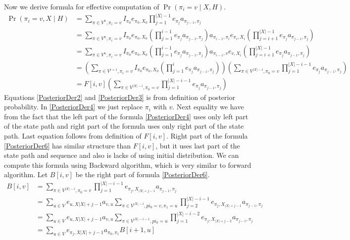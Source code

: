 Now we derive formula for effective computation of  $\Pr\left(\pi_i=v\mid
X,H\right)$.
\begin{align}
\Pr\left(\pi_i=v,X\mid H\right) &=  
				\sum_{\pi\in
				V^n,\pi_i=v}I_{\pi_0}e_{\pi_0,X_0}\prod_{j=1}^{|X|-1}e_{\pi_j}a_{\pi_{j-1},\pi_j}
					\label{PosteriorDer2}\\
				&= \sum_{\pi\in V^n,\pi_i=v}I_{\pi_0}e_{\pi_0,X_0}
				\left( 
					\prod_{j=1}^{i-1} e_{\pi_j}a_{\pi_{j-1},\pi_j}
				\right)
				a_{\pi_{i-1},\pi_i}e_{\pi_i,X_i}
				\left(  
					\prod_{j=i+1}^{|X|-1} e_{\pi_j}a_{\pi_{j-1},\pi_j}
				\right)
					\label{PosteriorDer3}\\
				&= \sum_{\pi\in V^n,\pi_i=v}I_{\pi_0}e_{\pi_0,X_0}
				\left( 
					\prod_{j=1}^{i-1} e_{\pi_j}a_{\pi_{j-1},\pi_j}
				\right)
				a_{\pi_{i-1},v}e_{v,X_i}
				\left(  
					\prod_{j=i+1}^{|X|-1} e_{\pi_j}a_{\pi_{j-1},\pi_j}
				\right)
					\label{PosteriorDer4}\\
				&= 
				\left(
					\sum_{\pi\in V^{i+1},\pi_i=v}I_{\pi_0}e_{\pi_0,X_0}
					\left(
						\prod_{j=1}^{i} e_{\pi_j}a_{\pi_{j-1},\pi_j}
					\right)
				\right)
				\left( 
					\sum_{\pi\in V^{|X|-i},\pi_0=v}
					\prod_{j=1}^{|X|-i-1} e_{\pi_j}a_{\pi_{j-1},\pi_j}
				\right)
					\label{PosteriorDer5}\\
				&= F[i,v]
				\left( 
					\sum_{\pi\in V^{|X|-i},\pi_0=v}
					\prod_{j=1}^{|X|-i-1} e_{\pi_j}a_{\pi_{j-1},\pi_j}
				\right)
					\label{PosteriorDer6}
\end{align}
Equations \ref{PosteriorDer2} and \ref{PosteriorDer3} is from definition of
posterior probability. In \ref{PosteriorDer4} we just replace $\pi_i$ with $v$.
Next equality we have from the fact that the left part of the formula
\ref{PosteriorDer4} uses only left part of the state path and right part of the
formula uses only right part of the state path. Last equation follows from
definition of $F[i,v]$. Right part of the formula \ref{PosteriorDer6} has
similar structure than $F[i,v]$, but it uses last part of the state path and
sequence and also is lacks of using initial distribution. We can compute 
this formula using Backward algorithm, which is very similar to forward
algorithm. Let $B[i,v]$ be the right part of formula \ref{PosteriorDer6}.
\begin{align}
B[i,v]&=
\sum_{\pi\in V^{|X|-i},\pi_0=v}
	\prod_{j=1}^{|X|-i-1}
		e_{\pi_j,X_{|X|+j-1}}a_{\pi_{j-1},\pi_j}\\
 &= 
 \sum_{u\in V}
 	e_{u,X{|X|+j-1}}a_{v,u}
	\sum_{\pi\in V^{|X|-i},pi_0=v,\pi_1=u}
		\prod_{j=2}^{|X|-i-1}
			e_{\pi_j,X_{|X|+j-1}}a_{\pi_{j-1},\pi_j}\\
 &= 
 \sum_{u\in V}
 	e_{u,X{|X|+j-1}}a_{v,u}
	\sum_{\pi\in V^{|X|-i-1},pi_0=u}
		\prod_{j=1}^{|X|-i-2}
			e_{\pi_j,X_{|X|+j-2}}a_{\pi_{j-1},\pi_j}\\
 &= 
 \sum_{u\in V}
 	e_{\pi_j,X{|X|+j-1}}a_{\pi_0,\pi_1}B[i+1,u]
\end{align}
